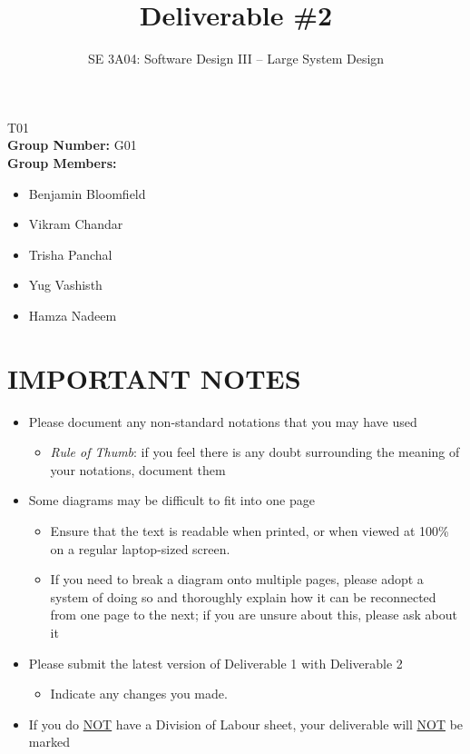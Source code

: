 \documentclass[]{article}
\title{Deliverable \#2}
\author{SE 3A04: Software Design III -- Large System Design}
\date{}
\begin{document}
\maketitle	
{} T01\\
{\bf Group Number:} G01 \\
{\bf Group Members:} 
\begin{itemize}
	\item Benjamin Bloomfield
	\item Vikram Chandar
    \item Trisha Panchal
    \item Yug Vashisth
    \item Hamza Nadeem
\end{itemize}

\section*{IMPORTANT NOTES}
\begin{itemize}
	\item Please document any non-standard notations that you may have used
	\begin{itemize}
		\item \emph{Rule of Thumb}: if you feel there is any doubt surrounding the meaning of your notations, document them
	\end{itemize}
	\item Some diagrams may be difficult to fit into one page
	\begin{itemize}
		\item Ensure that the text is readable when printed, or when viewed at 100\% on a regular laptop-sized screen.
		\item If you need to break a diagram onto multiple pages, please adopt a system of doing so and thoroughly explain how it can be reconnected from one page to the next; if you are unsure about this, please ask about it
	\end{itemize}
	\item Please submit the latest version of Deliverable 1 with Deliverable 2
	\begin{itemize}
		\item Indicate any changes you made.
	\end{itemize}
	\item If you do \underline{NOT} have a Division of Labour sheet, your deliverable will \underline{NOT} be marked
\end{itemize}
\end{document}
